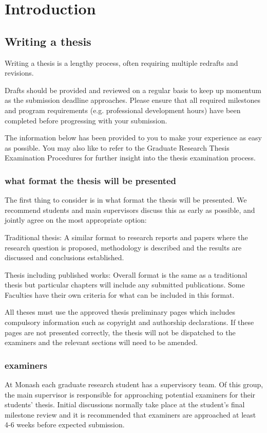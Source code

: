 \chapter{Introduction}

\section{Writing a thesis}
Writing a thesis is a lengthy process, often requiring multiple redrafts and revisions.

Drafts should be provided and reviewed on a regular basis to keep up momentum as the submission deadline approaches. Please ensure that all required milestones and program requirements (e.g. professional development hours) have been completed before progressing with your submission.

The information below has been provided to you to make your experience as easy as possible. You may also like to refer to the Graduate Research Thesis Examination Procedures for further insight into the thesis examination process.

\subsection{what format the thesis will be presented}
The first thing to consider is in what format the thesis will be presented.
We recommend students and main supervisors discuss this as early as possible, and jointly agree on the most appropriate option:

Traditional thesis: A similar format to research reports and papers where the research question is proposed, methodology is described and the results are discussed and conclusions established.

Thesis including published works: Overall format is the same as a traditional thesis but particular chapters will include any submitted publications. Some Faculties have their own criteria for what can be included in this format.

All theses must use the approved thesis preliminary pages which includes compulsory information such as copyright and authorship declarations. If these pages are not presented correctly, the thesis will not be dispatched to the examiners and the relevant sections will need to be amended.

\subsection{examiners}
At Monash each graduate research student has a supervisory team. Of this group, the main supervisor is responsible for approaching potential examiners for their students' thesis. Initial discussions normally take place at the student’s final milestone review and it is recommended that examiners are approached at least 4-6 weeks before expected submission.

